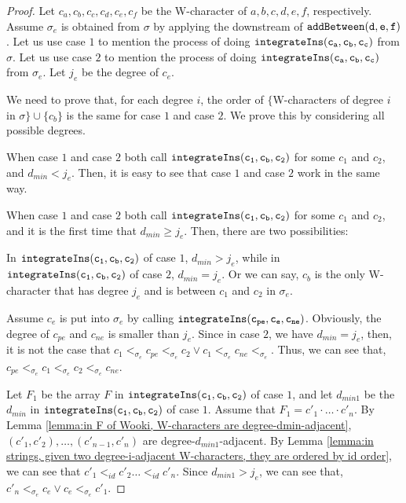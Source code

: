 \begin {proof}
Let $c_a,c_b,c_c,c_d,c_e,c_f$ be the W-character of $a,b,c,d,e,f$, respectively. Assume $\sigma_e$ is obtained from $\sigma$ by applying the downstream of $\alabelshort[{\tt addBetween}]{d,e,f}$. Let us use case $1$ to mention the process of doing $\alabelshort[{\tt integrateIns}]{c_a,c_b,c_c}$ from $\sigma$. Let us use case $2$ to mention the process of doing $\alabelshort[{\tt integrateIns}]{c_a,c_b,c_c}$ from $\sigma_e$. Let $j_e$ be the degree of $c_e$.

We need to prove that, for each degree $i$, the order of $\{$W-characters of degree $i$ in $\sigma \} \cup \{ c_b \}$ is the same for case $1$ and case $2$. We prove this by considering all possible degrees.

When case $1$ and case $2$ both call $\alabelshort[{\tt integrateIns}]{c_1,c_b,c_2}$ for some $c_1$ and $c_2$, and $d_{min}<j_e$. Then, it is easy to see that case $1$ and case $2$ work in the same way.

When case $1$ and case $2$ both call $\alabelshort[{\tt integrateIns}]{c_1,c_b,c_2}$ for some $c_1$ and $c_2$, and it is the first time that $d_{min} \geq j_e$. Then, there are two possibilities:

 In $\alabelshort[{\tt integrateIns}]{c_1,c_b,c_2}$ of case $1$, $d_{min} > j_e$, while in $\alabelshort[{\tt integrateIns}]{c_1,c_b,c_2}$ of case $2$, $d_{min} = j_e$. Or we can say, $c_b$ is the only W-character that has degree $j_e$ and is between $c_1$ and $c_2$ in $\sigma_e$.

Assume $c_e$ is put into $\sigma_e$ by calling $\alabelshort[{\tt integrateIns}]{c_{pe},c_e,c_{ne}}$. Obviously, the degree of $c_{pe}$ and $c_{ne}$ is smaller than $j_e$. Since in case $2$, we have $d_{min} = j_e$, then, it is not the case that $c_1 <_{\sigma_e} c_{pe} <_{\sigma_e} c_2 \vee c_1 <_{\sigma_e} c_{ne} <_{\sigma_e}$. Thus, we can see that, $c_{pe} <_{\sigma_e} c_1 <_{\sigma_e} c_2 <_{\sigma_e} c_{ne}$.

Let $F_1$ be the array $F$ in $\alabelshort[{\tt integrateIns}]{c_1,c_b,c_2}$ of case $1$, and let $d_{min1}$ be the $d_{min}$ in $\alabelshort[{\tt integrateIns}]{c_1,c_b,c_2}$ of case $1$. Assume that $F_1 = c'_1 \cdot \ldots \cdot c'_n$. By Lemma \ref{lemma:in F of Wooki, W-characters are degree-dmin-adjacent}, $(c'_1,c'_2),\ldots,(c'_{n-1},c'_n)$ are degree-$d_{min1}$-adjacent. By Lemma \ref{lemma:in strings, given two degree-i-adjacent W-characters, they are ordered by id order}, we can see that $c'_1 <_{id} c'_2 \ldots <_{id} c'_n$. Since $d_{min1} > j_e$, we can see that, $c'_n <_{\sigma_e} c_e \vee c_e <_{\sigma_e} c'_1$.


\end{proof}
